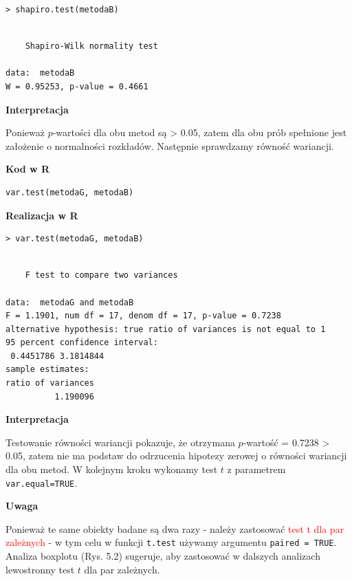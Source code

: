\documentclass[12pt,B5paper,]{book}
\begin{document}
\begin{verbatim}
> shapiro.test(metodaB)
\end{verbatim}

\begin{verbatim}

    Shapiro-Wilk normality test

data:  metodaB
W = 0.95253, p-value = 0.4661
\end{verbatim}

\vspace{0.8cm} \textbf{Interpretacja}

Ponieważ \(p\)-wartości dla obu metod są \textgreater{} 0.05, zatem dla
obu prób spełnione jest założenie o normalności rozkładów. Następnie
sprawdzamy równość wariancji.

\vspace{0.8cm} \textbf{Kod w R}

\begin{verbatim}
var.test(metodaG, metodaB)
\end{verbatim}

\vspace{0.8cm} \textbf{Realizacja w R}

\begin{verbatim}
> var.test(metodaG, metodaB)
\end{verbatim}

\begin{verbatim}

    F test to compare two variances

data:  metodaG and metodaB
F = 1.1901, num df = 17, denom df = 17, p-value = 0.7238
alternative hypothesis: true ratio of variances is not equal to 1
95 percent confidence interval:
 0.4451786 3.1814844
sample estimates:
ratio of variances 
          1.190096 
\end{verbatim}

\vspace{0.8cm} \textbf{Interpretacja}

Testowanie równości wariancji pokazuje, że otrzymana \(p\)-wartość =
0.7238 \textgreater{} 0.05, zatem nie ma podstaw do odrzucenia hipotezy
zerowej o równości wariancji dla obu metod. W kolejnym kroku wykonamy
test \(t\) z parametrem \texttt{var.equal=TRUE}.

\vspace{0.8cm} \textbf{Uwaga}

Ponieważ te same obiekty badane są dwa razy - należy zastosować
\textcolor{red}{test t dla par zależnych} - w tym celu w funkcji
\texttt{t.test} używamy argumentu \texttt{paired = TRUE}. Analiza
boxplotu (Rys. 5.2) sugeruje, aby zastosować w dalszych analizach
lewostronny test \(t\) dla par zależnych.
\end{document}
